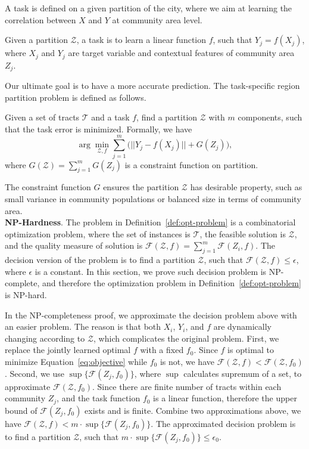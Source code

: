 A task is defined on a given partition of the city, where we aim at learning the correlation between $X$ and $Y$ at community area level.
\begin{definition}[Task]
Given a partition $\mathcal{Z}$, a task is to learn a linear function $f$, such that $Y_j = f(X_j)$, 
where $X_j$ and $Y_j$ are target variable and contextual features of community area $Z_j$.
\end{definition}


Our ultimate goal is to have a more accurate prediction. The task-specific region partition problem is defined as follows.
\begin{definition}
\label{def:opt-problem}
Given a set of tracts $\mathcal{T}$ and a task $f$, find a partition $\mathcal{Z}$ with $m$ components, such that the task error is minimized. Formally, we have
\begin{equation}
\label{eq:objective}
\arg\min_{\mathcal{Z}, f} \sum_{j=1}^m \Big(||Y_j - f(X_j)|| + G(Z_j)\Big),
\end{equation}
where $G(\mathcal{Z}) = \sum_{j=1}^m G(Z_j)$ is a constraint function on partition.
\end{definition}

The constraint function $G$ ensures the partition $\mathcal{Z}$ has desirable property, such as small variance in community populations or balanced size in terms of community area. \\


\textbf{NP-Hardness}. The problem in Definition~\ref{def:opt-problem} is a combinatorial optimization problem, where the set of instances is $\mathcal{T}$, the feasible solution is $\mathcal{Z}$, and the quality measure of solution is $\mathcal{F}(\mathcal{Z}, f) = \sum_{j=1}^m \mathcal{F}(Z_i, f)$. The decision version of the problem is to find a partition $\mathcal{Z}$, such that $\mathcal{F}(\mathcal{Z}, f) \leq \epsilon$, where $\epsilon$ is a constant. In this section, we prove such decision problem is NP-complete, and therefore the optimization problem in Definition~\ref{def:opt-problem} is NP-hard.

In the NP-completeness proof, we approximate the decision problem above with an easier problem. The reason is that both $X_i$, $Y_i$, and $f$ are dynamically changing according to $\mathcal{Z}$, which complicates the original problem. First, we replace the jointly learned optimal $f$ with a fixed $f_0$. Since $f$ is optimal to minimize Equation~\ref{eq:objective} while $f_0$ is not, we have $\mathcal{F}(\mathcal{Z}, f) < \mathcal{F}(\mathcal{Z}, f_0)$. Second, we use $\sup \{\mathcal{F}(Z_j, f_0) \}$, where $\sup$ calculates supremum of a set, to approximate $\mathcal{F}(\mathcal{Z}, f_0)$. Since there are finite number of tracts within each community $Z_j$, and the task function $f_0$ is a linear function, therefore the upper bound of $\mathcal{F}(Z_j, f_0)$ exists and is finite. Combine two approximations above, we have $\mathcal{F}(\mathcal{Z}, f) < m \cdot \sup \{ \mathcal{F}(Z_j, f_0)\}$. The approximated decision problem is to find a partition $\mathcal{Z}$, such that $m \cdot \sup \{\mathcal{F}(Z_j, f_0) \} \leq \epsilon_0$.

